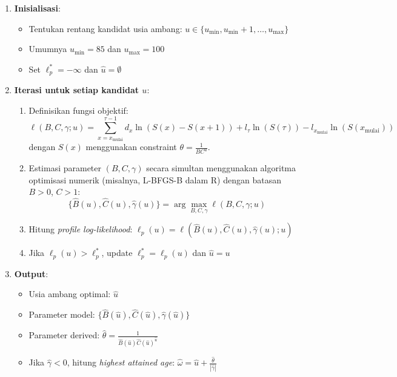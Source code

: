 \begin{enumerate}
    \item \textbf{Inisialisasi}:
    \begin{itemize}
        \item Tentukan rentang kandidat usia ambang: $u \in \{u_{\min}, u_{\min}+1, \ldots, u_{\max}\}$
        \item Umumnya $u_{\min} = 85$ dan $u_{\max} = 100$
        \item Set $\ell_p^* = -\infty$ dan $\hat{u} = \emptyset$
    \end{itemize}
    
    \item \textbf{Iterasi untuk setiap kandidat $u$}:
    \begin{enumerate}
        \item Definisikan fungsi objektif:
        \begin{equation}
        \ell(B, C, \gamma; u) = \sum_{x=x_{\text{mulai}}}^{\tau-1} d_x \ln(S(x) - S(x+1)) + l_\tau \ln(S(\tau)) - l_{x_{\text{mulai}}} \ln(S(x_{\text{mulai}}))
        \end{equation}
        dengan $S(x)$ menggunakan constraint $\theta = \frac{1}{BC^u}$.
        
        \item Estimasi parameter $(B, C, \gamma)$ secara simultan menggunakan algoritma optimisasi numerik (misalnya, L-BFGS-B dalam R) dengan batasan $B > 0$, $C > 1$:
        \begin{equation}
        \{\hat{B}(u), \hat{C}(u), \hat{\gamma}(u)\} = \arg\max_{B, C, \gamma} \ell(B, C, \gamma; u)
        \end{equation}
        
        \item Hitung \textit{profile log-likelihood}: $\ell_p(u) = \ell(\hat{B}(u), \hat{C}(u), \hat{\gamma}(u); u)$
        
        \item Jika $\ell_p(u) > \ell_p^*$, update $\ell_p^* = \ell_p(u)$ dan $\hat{u} = u$
    \end{enumerate}
    
    \item \textbf{Output}: 
    \begin{itemize}
        \item Usia ambang optimal: $\hat{u}$
        \item Parameter model: $\{\hat{B}(\hat{u}), \hat{C}(\hat{u}), \hat{\gamma}(\hat{u})\}$
        \item Parameter derived: $\hat{\theta} = \frac{1}{\hat{B}(\hat{u})\hat{C}(\hat{u})^{\hat{u}}}$
        \item Jika $\hat{\gamma} < 0$, hitung \textit{highest attained age}: $\hat{\omega} = \hat{u} + \frac{\hat{\theta}}{|\hat{\gamma}|}$
    \end{itemize}
\end{enumerate}

